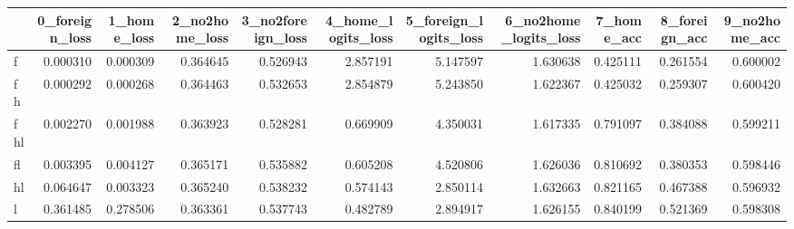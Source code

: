 \begin{tabular}{lrrrrrrrrrr}
\toprule
 & 0_foreign_loss & 1_home_loss & 2_no2home_loss & 3_no2foreign_loss & 4_home_logits_loss & 5_foreign_logits_loss & 6_no2home_logits_loss & 7_home_acc & 8_foreign_acc & 9_no2home_acc \\
\midrule
f & 0.000310 & 0.000309 & 0.364645 & 0.526943 & 2.857191 & 5.147597 & 1.630638 & 0.425111 & 0.261554 & 0.600002 \\
fh & 0.000292 & 0.000268 & 0.364463 & 0.532653 & 2.854879 & 5.243850 & 1.622367 & 0.425032 & 0.259307 & 0.600420 \\
fhl & 0.002270 & 0.001988 & 0.363923 & 0.528281 & 0.669909 & 4.350031 & 1.617335 & 0.791097 & 0.384088 & 0.599211 \\
fl & 0.003395 & 0.004127 & 0.365171 & 0.535882 & 0.605208 & 4.520806 & 1.626036 & 0.810692 & 0.380353 & 0.598446 \\
hl & 0.064647 & 0.003323 & 0.365240 & 0.538232 & 0.574143 & 2.850114 & 1.632663 & 0.821165 & 0.467388 & 0.596932 \\
l & 0.361485 & 0.278506 & 0.363361 & 0.537743 & 0.482789 & 2.894917 & 1.626155 & 0.840199 & 0.521369 & 0.598308 \\
\bottomrule
\end{tabular}
